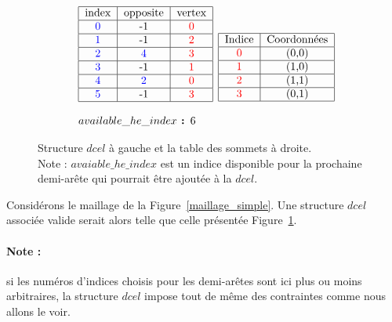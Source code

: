 \documentclass[]{article}
\begin{document}
\begin{figure}[H]
	\[
		\begin{aligned}[c]
			\begin{array}{l}
				\begin{tabular}{|c|c|c|c|}
					\hline
					index         & opposite      & vertex       \\
					\hline
					\color{blue}0 & -1            & \color{red}0 \\
					\hline
					\color{blue}1 & -1            & \color{red}2 \\
					\hline
					\color{blue}2 & \color{blue}4 & \color{red}3 \\
					\hline
					\color{blue}3 & -1            & \color{red}1 \\
					\hline
					\color{blue}4 & \color{blue}2 & \color{red}0 \\
					\hline
					\color{blue}5 & -1            & \color{red}3 \\
					\hline
				\end{tabular} \\\\
				available\_he\_index\textbf{ : }6
			\end{array}
		\end{aligned}
		\begin{aligned}[c]
			\begin{tabular}{|c|c|}
				\hline
				Indice       & Coordonnées \\
				\hline
				\color{red}0 & (0,0)       \\
				\hline
				\color{red}1 & (1,0)       \\
				\hline
				\color{red}2 & (1,1)       \\
				\hline
				\color{red}3 & (0,1)       \\
				\hline
			\end{tabular}
		\end{aligned}
	\]
	\caption{Structure $dcel$ à gauche et la table des sommets à droite.\\Note : $avaiable\_he\_index$ est un indice disponible pour la prochaine demi-arête qui pourrait être ajoutée à la $dcel$.}
	\label{maillage_simple_struct_associee}
\end{figure}

Considérons le maillage de la Figure~\ref{maillage_simple}. Une structure $dcel$ associée valide serait alors telle que celle présentée Figure~\ref{maillage_simple_struct_associee}.

\paragraph*{Note :} si les numéros d'indices choisis pour les demi-arêtes sont ici plus ou moins arbitraires, la structure $dcel$ impose tout de même des contraintes comme nous allons le voir.
\end{document}
